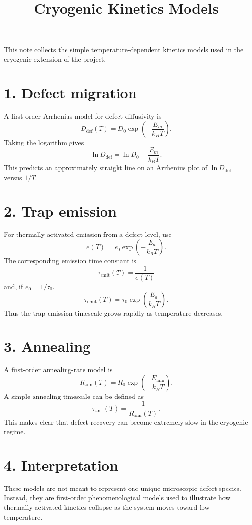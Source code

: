 \documentclass[11pt]{article}
\title{Cryogenic Kinetics Models}
\begin{document}
\maketitle

This note collects the simple temperature-dependent kinetics models used in the cryogenic extension of the project.

\section*{1. Defect migration}
A first-order Arrhenius model for defect diffusivity is
\[
D_{\mathrm{def}}(T)=D_0 \exp\!\left(-\frac{E_m}{k_B T}\right).
\]
Taking the logarithm gives
\[
\ln D_{\mathrm{def}} = \ln D_0 - \frac{E_m}{k_B T}.
\]
This predicts an approximately straight line on an Arrhenius plot of $\ln D_{\mathrm{def}}$ versus $1/T$.

\section*{2. Trap emission}
For thermally activated emission from a defect level, use
\[
e(T)=e_0 \exp\!\left(-\frac{E_a}{k_B T}\right).
\]
The corresponding emission time constant is
\[
\tau_{\mathrm{emit}}(T)=\frac{1}{e(T)}
\]
and, if $e_0 = 1/\tau_0$,
\[
\tau_{\mathrm{emit}}(T)=\tau_0 \exp\!\left(\frac{E_a}{k_B T}\right).
\]
Thus the trap-emission timescale grows rapidly as temperature decreases.

\section*{3. Annealing}
A first-order annealing-rate model is
\[
R_{\mathrm{ann}}(T)=R_0 \exp\!\left(-\frac{E_{\mathrm{ann}}}{k_B T}\right).
\]
A simple annealing timescale can be defined as
\[
\tau_{\mathrm{ann}}(T)=\frac{1}{R_{\mathrm{ann}}(T)}.
\]
This makes clear that defect recovery can become extremely slow in the cryogenic regime.

\section*{4. Interpretation}
These models are not meant to represent one unique microscopic defect species. Instead, they are first-order phenomenological models used to illustrate how thermally activated kinetics collapse as the system moves toward low temperature.
\end{document}

